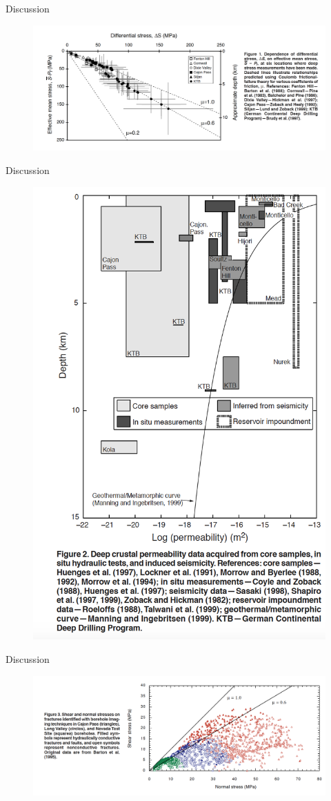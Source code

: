 \documentclass[12pt]{beamer}
\begin{document}
\begin{frame}[fragile]{Discussion}
    \begin{figure}
        \includegraphics[width=1\linewidth]{images/1}
    \end{figure}
\end{frame}
\begin{frame}[fragile]{Discussion}
    \begin{figure}
        \includegraphics[width=0.48\linewidth]{images/2}
    \end{figure}
\end{frame}
\begin{frame}[fragile]{Discussion}
    \begin{figure}
        \includegraphics[width=1\linewidth]{images/3}
    \end{figure}
\end{frame}
\end{document}
